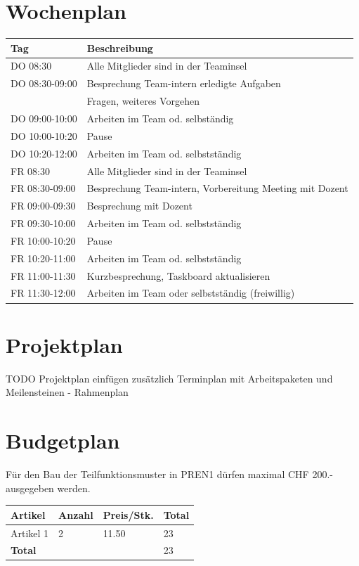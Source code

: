 \documentclass[a4paper]{report}
\begin{document}
\section{Wochenplan}
\begin{tabular}{|p{}|p{}|}
	\hline
	\textbf{Tag} & \textbf{Beschreibung} \\
	\hline
	DO 08:30 & Alle Mitglieder sind in der Teaminsel \\
	\hline
	DO 08:30-09:00 & Besprechung Team-intern erledigte Aufgaben \\
	& Fragen, weiteres Vorgehen \\
	\hline
	DO 09:00-10:00 & Arbeiten im Team od. selbständig \\
	\hline
	DO 10:00-10:20 & Pause \\
	\hline
	DO 10:20-12:00 & Arbeiten im Team od. selbstständig \\
	\hline
	FR 08:30 & Alle Mitglieder sind in der Teaminsel \\
	\hline
	FR 08:30-09:00 & Besprechung Team-intern, Vorbereitung Meeting mit Dozent \\
	\hline
	FR 09:00-09:30& Besprechung mit Dozent \\
	\hline
	FR 09:30-10:00 & Arbeiten im Team od. selbstständig \\
	\hline
	FR 10:00-10:20 & Pause \\
	\hline
	FR 10:20-11:00 & Arbeiten im Team od. selbstständig \\
	\hline
	FR 11:00-11:30 & Kurzbesprechung, Taskboard aktualisieren \\
	\hline
	FR 11:30-12:00 & Arbeiten im Team oder selbstständig (freiwillig)\\
	\hline
\end{tabular}

\section{Projektplan}
TODO Projektplan einfügen zusätzlich Terminplan mit Arbeitspaketen und Meilensteinen - Rahmenplan

\section{Budgetplan}
Für den Bau der Teilfunktionsmuster in PREN1 dürfen maximal CHF 200.- ausgegeben werden.

\vspace{1em}
\noindent
\begin{tabular}{|p{}|p{}|p{}|p{}|}
	\hline
	\textbf{Artikel} & \textbf{Anzahl} & \textbf{Preis/Stk.} & \textbf{Total} \\
	\hline
	Artikel 1 & 2 & 11.50 & 23 \\
	\hline
	\textbf{Total} & & & 23 \\
	\hline
\end{tabular}
\end{document}
